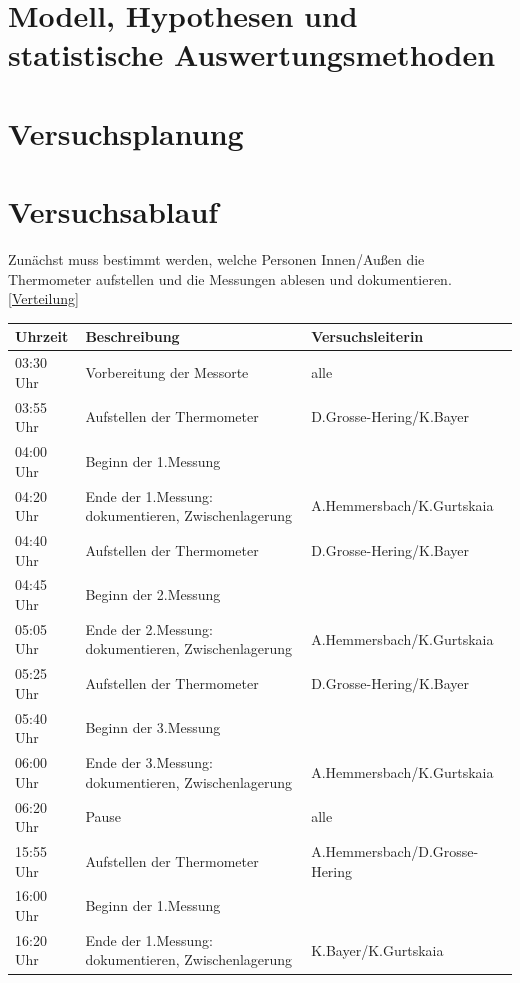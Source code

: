 \documentclass[ ngerman, fontsize= 12pt, paper=a4, headings=big, titlepage=true]{article}
\begin{document}
\section{Modell, Hypothesen und statistische Auswertungsmethoden}
\section{Versuchsplanung}

\newpage
\section{Versuchsablauf}
Zunächst muss bestimmt werden, welche Personen Innen/Außen die Thermometer aufstellen und die Messungen ablesen und dokumentieren. \ref{Verteilung}
\begin{table}[h]
	\begin{tabular}{l|l|l}
		
		Uhrzeit		&	Beschreibung									&	Versuchsleiterin \\
		\hline
		03:30 Uhr	&	Vorbereitung der Messorte						& alle\\
		03:55 Uhr	&	Aufstellen der Thermometer						& D.Grosse-Hering/K.Bayer\\
		04:00 Uhr	&	Beginn der 1.Messung							& \\
		04:20 Uhr	& 	Ende der 1.Messung: dokumentieren, Zwischenlagerung & A.Hemmersbach/K.Gurtskaia\\
		
		04:40 Uhr	&	Aufstellen der Thermometer						&D.Grosse-Hering/K.Bayer\\
		04:45 Uhr	&	Beginn der 2.Messung							& \\
		05:05 Uhr	& 	Ende der 2.Messung: dokumentieren, Zwischenlagerung & A.Hemmersbach/K.Gurtskaia\\
		
		05:25 Uhr	&	Aufstellen der Thermometer						&D.Grosse-Hering/K.Bayer\\
		05:40 Uhr	&	Beginn der 3.Messung							& \\
		06:00 Uhr	& 	Ende der 3.Messung: dokumentieren, Zwischenlagerung & A.Hemmersbach/K.Gurtskaia\\
		
		\hline
		06:20 Uhr	& 	Pause											& alle \\
		\hline
		
		15:55 Uhr	&	Aufstellen der Thermometer						&A.Hemmersbach/D.Grosse-Hering\\
		16:00 Uhr	&	Beginn der 1.Messung							& \\
		16:20 Uhr	& 	Ende der 1.Messung: dokumentieren, Zwischenlagerung &K.Bayer/K.Gurtskaia \\
		

\end{tabular}
\end{table}
\end{document}
